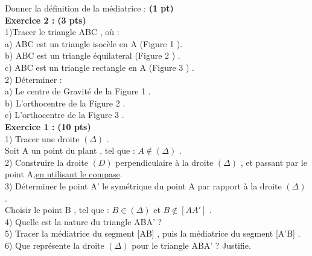 \documentclass{exam}
\begin{document}
\begin{questions}
\question Donner la définition de la médiatrice :
\textbf{(1 pt)} 
\\[0.2cm]
\makebox[1\textwidth]{\enspace\hrulefill}
\question \textbf{Exercice 2 :} 
\textbf{(3 pts)} 
\\[0.2cm]
1)Tracer le triangle ABC , où :\\
\hspace*{0.2cm} a) ABC est un triangle isocèle en A (Figure 1 ). \\
\hspace*{0.2cm} b) ABC est un triangle équilateral (Figure 2 ) .\\
\hspace*{0.2cm} c) ABC est un triangle rectangle en A (Figure 3 ) . \\
2) Déterminer :\\
\hspace*{0.2cm} a) Le centre de Gravité de la Figure 1 . \\
\hspace*{0.2cm} b) L’orthocentre de la Figure 2 . \\
\hspace*{0.2cm} c) L’orthocentre de la Figure 3 .\\
\makebox[1\textwidth]{\enspace\hrulefill}
\question \textbf{Exercice 1 :} 
\textbf{(10 pts)} 
\\[0.2cm]
1) Tracer une droite $ (\Delta) $ .\\[0.2cm]
 Soit A un point du plant , tel que :  $ A \notin (\Delta) $ .\\[0.2cm]
2) Construire la droite $ (D) $ perpendiculaire  à la droite $ (\Delta) $ , et passant par le point A,\underline{en utilisant le compase}.\\
3) Déterminer le point A' le symétrique du point A par rapport  à la droite $ (\Delta) $ .\\[0.2cm]
Choisir le point B , tel que :  $ B \in (\Delta) $ et  $ B \notin [AA'] $  .\\[0.2cm]
4) Quelle est la nature du triangle ABA' ?\\
5)  Tracer la médiatrice du segment [AB] , puis la médiatrice du segment [A'B] .\\
6) Que représente la droite $(\Delta) $ pour le triangle ABA' ? Justifie.\\[0.2cm]

\end{questions}
\end{document}
